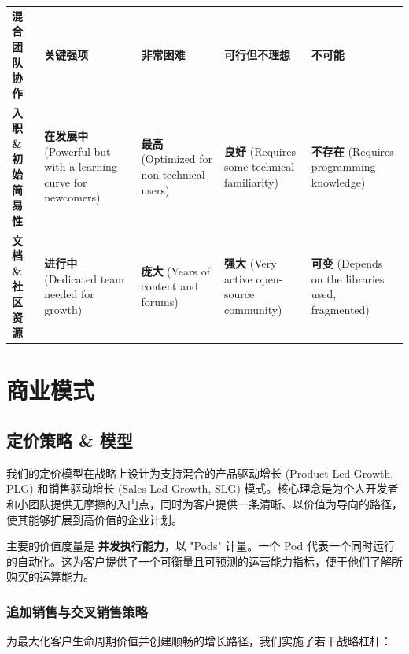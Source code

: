 \documentclass[11pt, a4paper, oneside]{article}
\begin{document}
\begin{table}[H]
{\begin{tabularx}{1.2\textwidth}{lLLLL}
\addlinespace
\textbf{混合团队协作} & \textbf{关键强项} & \textbf{非常困难} & \textbf{可行但不理想} & \textbf{不可能} \\
\addlinespace
\textbf{入职 \& 初始简易性} & \textbf{在发展中} (Powerful but with a learning curve for newcomers) & \textbf{最高} (Optimized for non-technical users) & \textbf{良好} (Requires some technical familiarity) & \textbf{不存在} (Requires programming knowledge) \\
\addlinespace
\textbf{文档 \& 社区资源} & \textbf{进行中} (Dedicated team needed for growth) & \textbf{庞大} (Years of content and forums) & \textbf{强大} (Very active open-source community) & \textbf{可变} (Depends on the libraries used, fragmented) \\
\bottomrule
\end{tabularx}%
}
\end{table}

\section{商业模式}
\subsection{定价策略 \& 模型}
我们的定价模型在战略上设计为支持混合的产品驱动增长 (Product-Led Growth, PLG) 和销售驱动增长 (Sales-Led Growth, SLG) 模式。核心理念是为个人开发者和小团队提供无摩擦的入门点，同时为客户提供一条清晰、以价值为导向的路径，使其能够扩展到高价值的企业计划。

主要的价值度量是 \textbf{并发执行能力}，以 "Pods" 计量。一个 Pod 代表一个同时运行的自动化。这为客户提供了一个可衡量且可预测的运营能力指标，便于他们了解所购买的运算能力。

\subsubsection{追加销售与交叉销售策略}

为最大化客户生命周期价值并创建顺畅的增长路径，我们实施了若干战略杠杆：
\end{document}
